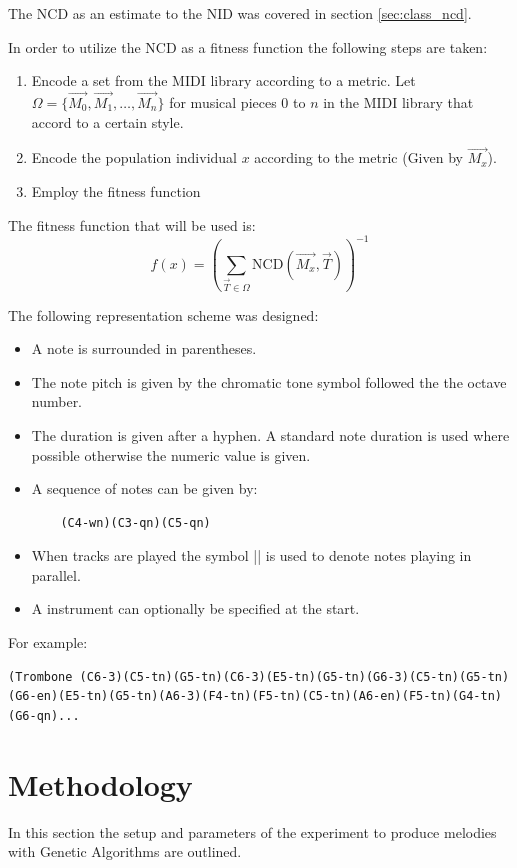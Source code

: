 The \ac{NCD} as an estimate to the \ac{NID} was covered in section \ref{sec:class_ncd}.

In order to utilize the \ac{NCD} as a fitness function the following steps are taken:
\begin{enumerate}
\item Encode a set from the \ac{MIDI} library according to a metric. Let $\Omega = \{\vec{M_0}, \vec{M_1}, \ldots, \vec{M_n}\}$ for musical pieces $0$ to $n$ in the \ac{MIDI} library that accord to a certain style.
\item Encode the population individual $x$ according to the metric (Given by $\vec{M_x}$).
\item Employ the fitness function
\end{enumerate}

The fitness function that will be used is:
\[f(x) =  \left(\sum_{\vec{T}\in\Omega} \text{NCD}(\vec{M_x}, \vec{T}) \right)^{-1}\]

The following representation scheme was designed:
\begin{itemize}
\item A note is surrounded in parentheses.
\item The note pitch is given by the chromatic tone symbol followed the the octave number.
\item The duration is given after a hyphen. A standard note duration is used where possible otherwise the numeric value is given.
\item 
A sequence of notes can be given by: 
	\begin{lstlisting} 
	(C4-wn)(C3-qn)(C5-qn) 
	\end{lstlisting}
\item When tracks are played the symbol || is used to denote notes playing in parallel.
\item A instrument can optionally be specified at the start.
\end{itemize}

For example:
\begin{lstlisting}
(Trombone (C6-3)(C5-tn)(G5-tn)(C6-3)(E5-tn)(G5-tn)(G6-3)(C5-tn)(G5-tn)(G6-en)(E5-tn)(G5-tn)(A6-3)(F4-tn)(F5-tn)(C5-tn)(A6-en)(F5-tn)(G4-tn)(G6-qn)...
\end{lstlisting}


\section{Methodology}
In this section the setup and parameters of the experiment to produce melodies with Genetic Algorithms are outlined.

